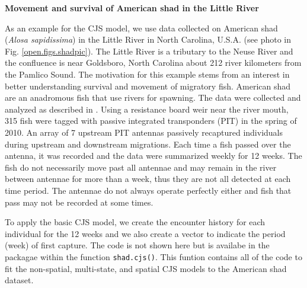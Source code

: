 {\flushleft \bf Movement and survival of American shad in the Little River}

As an example for the CJS model, we use data collected on American
shad (\textit{Alosa sapidissima}) in the Little River in North Carolina,
U.S.A. (see photo in Fig. \ref{open.figs.shadpic}).  The Little River
is a tributary to the Neuse River and the confluence is near
Goldsboro, North Carolina about 212 river kilometers from the Pamlico
Sound.  The motivation for this example stems from an interest in
better understanding survival and movement of migratory fish.
American shad are an anadromous fish that use rivers for spawning.
The data were collected and analyzed as described in
\citet{raabe_diss:2012}.  Using a resistance board weir near the river
mouth, 315 fish were tagged with passive integrated transponders (PIT)
in the spring of 2010. An array of 7 upstream PIT antennas passively
recaptured individuals during upstream and downstream migrations.
Each time a fish passed over the antenna, it was recorded and the data
were summarized weekly for 12 weeks.  The fish do not necessarily move
past all antennae and may remain in the river between antennae for
more than a week, thus they are not all detected at each time period.
The antennae do not always operate perfectly either and fish that pass
may not be recorded at some times.

To apply the basic CJS model, we create the encounter history for each
individual for the 12 weeks and we also create a vector to indicate
the period (week) of first capture. The code is not shown here but is
availabe in the \scrbook~ packagae within the function
\verb+shad.cjs()+.  This funtion contains all of the code to fit the
non-spatial, multi-state, and spatial CJS models to the American shad
dataset.
 

